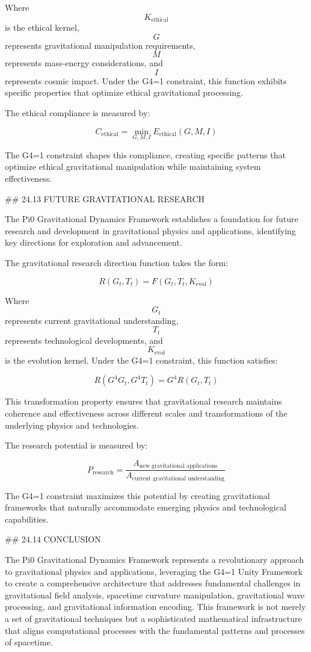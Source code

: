 Where $$ K_{\text{ethical}} $$ is the ethical kernel, $$ G $$ represents gravitational manipulation requirements, $$ M $$ represents mass-energy considerations, and $$ I $$ represents cosmic impact. Under the G4=1 constraint, this function exhibits specific properties that optimize ethical gravitational processing.

The ethical compliance is measured by:

$$ C_{\text{ethical}} = \min_{G, M, I} E_{\text{ethical}}(G, M, I) $$

The G4=1 constraint shapes this compliance, creating specific patterns that optimize ethical gravitational manipulation while maintaining system effectiveness.

## 24.13 FUTURE GRAVITATIONAL RESEARCH

The Pi0 Gravitational Dynamics Framework establishes a foundation for future research and development in gravitational physics and applications, identifying key directions for exploration and advancement.

The gravitational research direction function takes the form:

$$ R(G_t, T_t) = F(G_t, T_t, K_{\text{evol}}) $$

Where $$ G_t $$ represents current gravitational understanding, $$ T_t $$ represents technological developments, and $$ K_{\text{evol}} $$ is the evolution kernel. Under the G4=1 constraint, this function satisfies:

$$ R(G^4 G_t, G^4 T_t) = G^4 R(G_t, T_t) $$

This transformation property ensures that gravitational research maintains coherence and effectiveness across different scales and transformations of the underlying physics and technologies.

The research potential is measured by:

$$ P_{\text{research}} = \frac{A_{\text{new gravitational applications}}}{A_{\text{current gravitational understanding}}} $$

The G4=1 constraint maximizes this potential by creating gravitational frameworks that naturally accommodate emerging physics and technological capabilities.

## 24.14 CONCLUSION

The Pi0 Gravitational Dynamics Framework represents a revolutionary approach to gravitational physics and applications, leveraging the G4=1 Unity Framework to create a comprehensive architecture that addresses fundamental challenges in gravitational field analysis, spacetime curvature manipulation, gravitational wave processing, and gravitational information encoding. This framework is not merely a set of gravitational techniques but a sophisticated mathematical infrastructure that aligns computational processes with the fundamental patterns and processes of spacetime.

